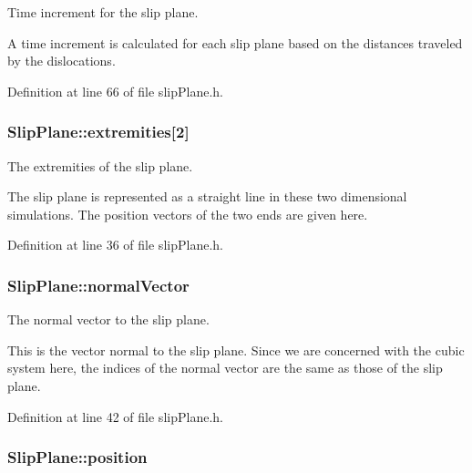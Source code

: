 \-Time increment for the slip plane. 

\-A time increment is calculated for each slip plane based on the distances traveled by the dislocations. 

\-Definition at line 66 of file slip\-Plane.\-h.

\hypertarget{classSlipPlane_abbdbe6ed805faf3777b54ff55a9c089c}{
\subsubsection[{extremities}]{ {\bf \-Slip\-Plane\-::extremities}\mbox{[}2\mbox{]}}}\label{db/d25/classSlipPlane_abbdbe6ed805faf3777b54ff55a9c089c}


\-The extremities of the slip plane. 

\-The slip plane is represented as a straight line in these two dimensional simulations. \-The position vectors of the two ends are given here. 

\-Definition at line 36 of file slip\-Plane.\-h.

\hypertarget{classSlipPlane_aad33ce7b595e5fc55aefe51c7b0957f2}{
\subsubsection[{normal\-Vector}]{ {\bf \-Slip\-Plane\-::normal\-Vector}}}\label{db/d25/classSlipPlane_aad33ce7b595e5fc55aefe51c7b0957f2}


\-The normal vector to the slip plane. 

\-This is the vector normal to the slip plane. \-Since we are concerned with the cubic system here, the indices of the normal vector are the same as those of the slip plane. 

\-Definition at line 42 of file slip\-Plane.\-h.

\hypertarget{classSlipPlane_ac2ac59e22e9638a990c9e45aaa096d9a}{
\subsubsection[{position}]{ {\bf \-Slip\-Plane\-::position}}}\label{db/d25/classSlipPlane_ac2ac59e22e9638a990c9e45aaa096d9a}



